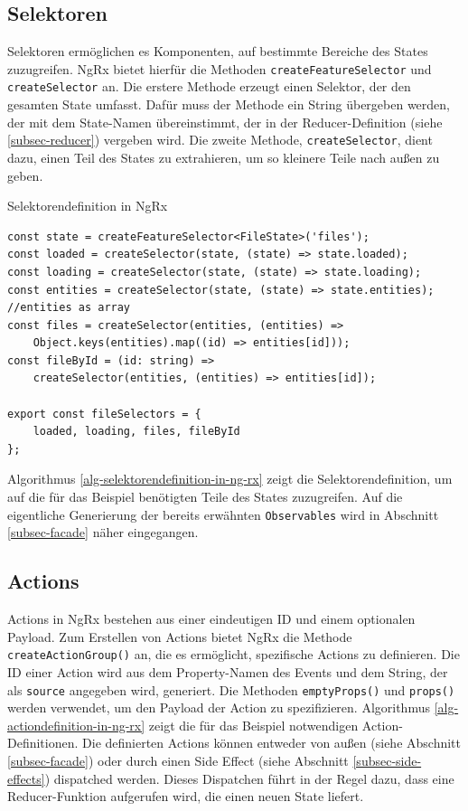 \documentclass[12pt]{book}          %
\begin{document}
\subsection{Selektoren}
\label{subsec-selektoren}

Selektoren ermöglichen es Komponenten, auf bestimmte Bereiche des States zuzugreifen. NgRx bietet hierfür die Methoden \texttt{createFeatureSelector} und \texttt{createSelector} an. Die erstere Methode erzeugt einen Selektor, der den gesamten State umfasst. Dafür muss der Methode ein String übergeben werden, der mit dem State-Namen übereinstimmt, der in der Reducer-Definition (siehe \ref{subsec-reducer}) vergeben wird. Die zweite Methode, \texttt{createSelector}, dient dazu, einen Teil des States zu extrahieren, um so kleinere Teile nach außen zu geben.

\begin{algorithm}
\caption{Selektorendefinition in NgRx}
\label{alg-selektorendefinition-in-ng-rx}
\begin{lstlisting}
const state = createFeatureSelector<FileState>('files');
const loaded = createSelector(state, (state) => state.loaded);
const loading = createSelector(state, (state) => state.loading);
const entities = createSelector(state, (state) => state.entities);
//entities as array
const files = createSelector(entities, (entities) => 
    Object.keys(entities).map((id) => entities[id]));
const fileById = (id: string) =>  
    createSelector(entities, (entities) => entities[id]);

export const fileSelectors = {
    loaded, loading, files, fileById
};
\end{lstlisting}
\end{algorithm}

Algorithmus \ref{alg-selektorendefinition-in-ng-rx} zeigt die Selektorendefinition, um auf die für das Beispiel benötigten Teile des States zuzugreifen. Auf die eigentliche Generierung der bereits erwähnten \texttt{Observables} wird in Abschnitt \ref{subsec-facade} näher eingegangen.

\subsection{Actions}
\label{subsec-actions}

Actions in NgRx bestehen aus einer eindeutigen ID und einem optionalen Payload. Zum Erstellen von Actions bietet NgRx die Methode \texttt{createActionGroup()} an, die es ermöglicht, spezifische Actions zu definieren. Die ID einer Action wird aus dem Property-Namen des Events und dem String, der als \texttt{source} angegeben wird, generiert. Die Methoden \texttt{emptyProps()} und \texttt{props()} werden verwendet, um den Payload der Action zu spezifizieren. Algorithmus \ref{alg-actiondefinition-in-ng-rx} zeigt die für das Beispiel notwendigen Action-Definitionen. Die definierten Actions können entweder von außen (siehe Abschnitt \ref{subsec-facade}) oder durch einen Side Effect (siehe Abschnitt \ref{subsec-side-effects}) dispatched werden. Dieses Dispatchen führt in der Regel dazu, dass eine Reducer-Funktion aufgerufen wird, die einen neuen State liefert.
\end{document}
